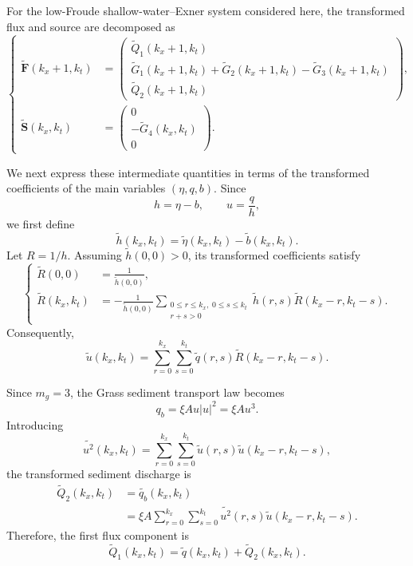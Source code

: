 \documentclass[11pt]{article}
\begin{document}
For the low-Froude shallow-water--Exner system considered here, the transformed flux and source
are decomposed as
\begin{equation}
\left\{
\begin{aligned}
    \widetilde{\mathbf{F}}(k_x+1,k_t)
    &=
    \begin{pmatrix}
        \widetilde{Q}_1(k_x+1,k_t) \\[0.2em]
        \widetilde{G}_1(k_x+1,k_t)
        +\widetilde{G}_2(k_x+1,k_t)
        -\widetilde{G}_3(k_x+1,k_t) \\[0.2em]
        \widetilde{Q}_2(k_x+1,k_t)
    \end{pmatrix},
    \\[1em]
    \widetilde{\mathbf{S}}(k_x,k_t)
    &=
    \begin{pmatrix}
        0 \\[0.2em]
        -\widetilde{G}_4(k_x,k_t) \\[0.2em]
        0
    \end{pmatrix}.
\end{aligned}
\right.
\tag{12}
\end{equation}

We next express these intermediate quantities in terms of the
transformed coefficients of the main variables
\((\eta,q,b)\). Since
\[
    h=\eta-b,
    \qquad
    u=\frac{q}{h},
\]
we first define
\[
    \widetilde{h}(k_x,k_t)
    =
    \widetilde{\eta}(k_x,k_t)
    -
    \widetilde{b}(k_x,k_t).
\]
Let \(R=1/h\). Assuming \(\widetilde{h}(0,0)>0\), its transformed
coefficients satisfy
\[
\left\{
\begin{aligned}
    \widetilde{R}(0,0)
    &=
    \frac{1}{\widetilde{h}(0,0)},                                  \\[0.4em]
    \widetilde{R}(k_x,k_t)
    &=
    -\frac{1}{\widetilde{h}(0,0)}
    \sum_{\substack{0\leq r\leq k_x,\;0\leq s\leq k_t\\r+s>0}}
    \widetilde{h}(r,s)
    \widetilde{R}(k_x-r,k_t-s).
\end{aligned}
\right.
\]
Consequently,
\[
    \widetilde{u}(k_x,k_t)
    =
    \sum_{r=0}^{k_x}\sum_{s=0}^{k_t}
    \widetilde{q}(r,s)
    \widetilde{R}(k_x-r,k_t-s).
\]

Since \(m_g=3\), the Grass sediment transport law becomes
\[
    q_b=\xi A u|u|^2=\xi A u^3.
\]
Introducing
\[
    \widetilde{u^2}(k_x,k_t)
    =
    \sum_{r=0}^{k_x}\sum_{s=0}^{k_t}
    \widetilde{u}(r,s)
    \widetilde{u}(k_x-r,k_t-s),
\]
the transformed sediment discharge is
\begin{align*}
    \widetilde{Q}_2(k_x,k_t)
    &=
    \widetilde{q_b}(k_x,k_t)                                      \\
    &=
    \xi A
    \sum_{r=0}^{k_x}\sum_{s=0}^{k_t}
    \widetilde{u^2}(r,s)
    \widetilde{u}(k_x-r,k_t-s).
\end{align*}
Therefore, the first flux component is
\[
    \widetilde{Q}_1(k_x,k_t)
    =
    \widetilde{q}(k_x,k_t)
    +
    \widetilde{Q}_2(k_x,k_t).
\]
\end{document}
